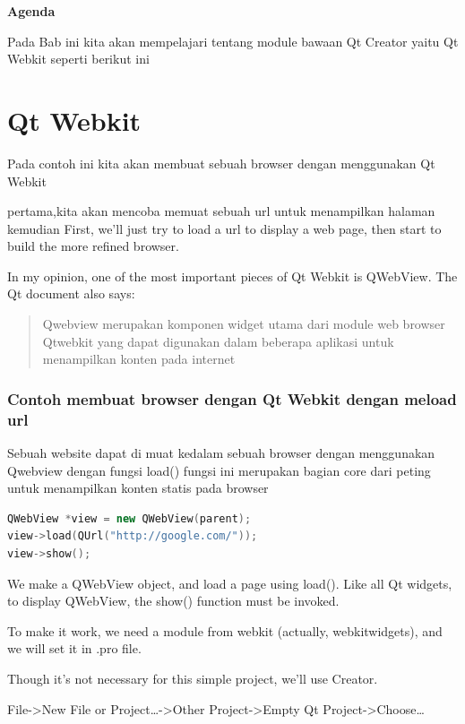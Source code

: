 \textbf{Agenda}

Pada Bab ini kita akan mempelajari tentang module bawaan Qt Creator yaitu
Qt Webkit seperti berikut ini

\minitoc

\section{Qt Webkit}\label{qt-webkit}

Pada contoh ini kita akan membuat sebuah browser dengan menggunakan 
Qt Webkit 

pertama,kita akan mencoba memuat sebuah url untuk menampilkan halaman
kemudian 
First, we'll just try to load a url to display a web page, then start to
build the more refined browser.

In my opinion, one of the most important pieces of Qt Webkit is
QWebView. The Qt document also says:

\begin{quote}
Qwebview merupakan komponen widget utama dari module web browser Qtwebkit
yang dapat digunakan dalam beberapa aplikasi untuk menampilkan konten
pada internet 
\end{quote}

\subsubsection*{Contoh membuat browser dengan Qt Webkit dengan meload url}\label{my-web-browser-version-1}

Sebuah website dapat di muat kedalam sebuah browser dengan menggunakan Qwebview 
dengan fungsi load() fungsi ini merupakan bagian core dari peting untuk menampilkan 
konten statis pada browser

\begin{lstlisting}[language=c++, numbers=none]
QWebView *view = new QWebView(parent);
view->load(QUrl("http://google.com/"));
view->show();
\end{lstlisting}

We make a QWebView object, and load a page using load(). Like all Qt
widgets, to display QWebView, the show() function must be invoked.

To make it work, we need a module from webkit (actually, webkitwidgets),
and we will set it in .pro file.

Though it's not necessary for this simple project, we'll use Creator.

File-\textgreater{}New File or Project\ldots{}-\textgreater{}Other
Project-\textgreater{}Empty Qt Project-\textgreater{}Choose\ldots{}

